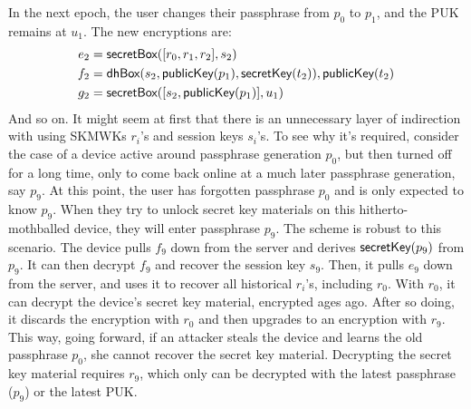 In the next epoch, the user changes their passphrase from $p_0$ to $p_1$, and the PUK remains
at $u_1$. The new encryptions are:
%
\begin{align*}
e_2 &= \textsf{secretBox}([r_0,r_1,r_2], s_2) \\
f_2 &= \textsf{dhBox}(s_2, \textsf{publicKey}(p_1), \textsf{secretKey}(t_2)), \textsf{publicKey}(t_2) \\
g_2 &= \textsf{secretBox}([s_2,\textsf{publicKey}(p_1)], u_1) \\
\end{align*}
%
And so on. It might seem at first that there is an unnecessary layer of indirection with using
SKMWKs $r_i$'s and session keys $s_i$'s. To see why it's required, consider the case of a 
device active around passphrase generation $p_0$, but then turned off for a long time,
only to come back online at a much later passphrase generation, say $p_9$. At this point,
the user has forgotten passphrase $p_0$ and is only expected to know $p_9$. When they try
to unlock secret key materials on this hitherto-mothballed device, they will enter passphrase
$p_9$. The scheme is robust to this scenario. The device pulls $f_9$ down from the server
and derives $\textsf{secretKey}(p_9)$ from $p_9$. It can then decrypt $f_9$ and recover the session key $s_9$.
Then, it pulls $e_9$ down from the server, and uses it to recover all historical $r_i$'s, including
$r_0$. With $r_0$, it can decrypt the device's secret key material, encrypted ages ago. After so doing, it discards
the encryption with $r_0$ and then upgrades to an encryption with $r_9$. This way, going forward,
if an attacker steals the device and learns the old passphrase $p_0$, she cannot recover
the secret key material. Decrypting the secret key material requires $r_9$, which only
can be decrypted with the latest passphrase ($p_9$) or the latest PUK.



